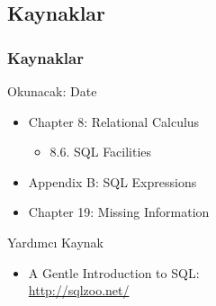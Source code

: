 \documentclass[dvipsnames]{beamer}
\theoremstyle{plain}
\begin{document}
\subsection*{Kaynaklar}

\begin{frame}
  \frametitle{Kaynaklar}
  
  \begin{block}{Okunacak: Date}
    \begin{itemize}
      \item Chapter 8: Relational Calculus
      \begin{itemize}
        \item 8.6. \alert{SQL Facilities}
      \end{itemize}

      \item Appendix B: \alert{SQL Expressions}
      \item Chapter 19: Missing Information
    \end{itemize}
  \end{block}
  
  \begin{block}{Yardımcı Kaynak}
    \begin{itemize}
      \item A Gentle Introduction to SQL:\\
        \url{http://sqlzoo.net/}
    \end{itemize}
  \end{block}
\end{frame}
\end{document}

